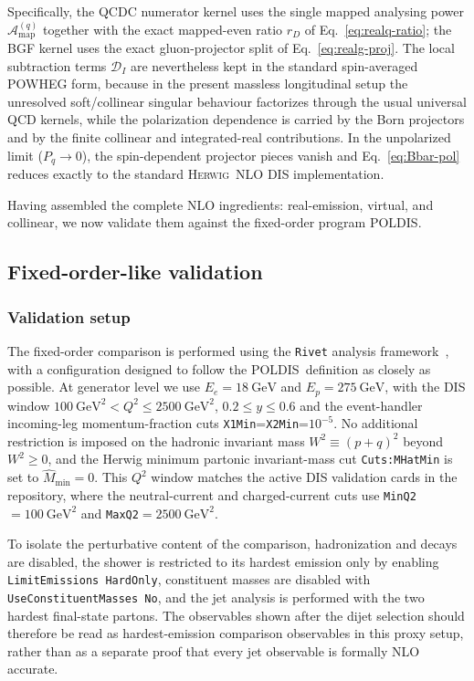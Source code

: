 \documentclass[a4paper,11pt]{article}
\newcommand{\Herwig}{\textsc{Herwig}}
\newcommand{\POLDIS}{\textsc{POLDIS}}
\begin{document}
Specifically, the QCDC numerator kernel uses the single mapped analysing power $\mathcal{A}_{\text{map}}^{(q)}$ together with the exact mapped-even ratio $r_D$ of Eq.~\eqref{eq:realq-ratio}; the BGF kernel uses the exact gluon-projector split of Eq.~\eqref{eq:realg-proj}.  The local subtraction terms $\mathcal{D}_I$ are nevertheless kept in the standard spin-averaged POWHEG form, because in the present massless longitudinal setup the unresolved soft/collinear singular behaviour factorizes through the usual universal QCD kernels, while the polarization dependence is carried by the Born projectors and by the finite collinear and integrated-real contributions.
In the unpolarized limit ($P_q\to0$), the spin-dependent projector pieces vanish and Eq.~\eqref{eq:Bbar-pol} reduces exactly to the standard \Herwig\ NLO DIS implementation.

Having assembled the complete NLO ingredients: real-emission, virtual, and collinear, we now validate them against the fixed-order program \POLDIS.

\subsection{Fixed-order-like validation}

\subsubsection{Validation setup}
The fixed-order comparison is performed using the \texttt{Rivet} analysis framework~\cite{Bierlich:2024vqo}, with a configuration designed to
follow the \POLDIS\ definition as closely as possible. At generator
level we use $E_e=18~\mathrm{GeV}$ and $E_p=275~\mathrm{GeV}$, with the DIS window
$100~\mathrm{GeV}^2 < Q^2 \le 2500~\mathrm{GeV}^2$, $0.2 \le y \le 0.6$ and
the event-handler incoming-leg momentum-fraction cuts \texttt{X1Min}=\texttt{X2Min}=$10^{-5}$. No additional restriction is imposed on the hadronic invariant mass $W^2 \equiv (p + q)^2$ beyond
$W^2 \ge 0$, and the Herwig minimum partonic invariant-mass cut \texttt{Cuts:MHatMin} is set to
$\hat{M}_{\mathrm{min}}=0$.
This $Q^2$ window matches the active DIS validation cards in the repository, where the neutral-current and charged-current cuts use \texttt{MinQ2}$=100~\mathrm{GeV}^2$ and \texttt{MaxQ2}$=2500~\mathrm{GeV}^2$.

To isolate the perturbative content of the comparison, hadronization and decays are disabled, the shower
is restricted to its hardest emission only by enabling \texttt{LimitEmissions HardOnly}, constituent masses are disabled with \texttt{UseConstituentMasses No}, and the
jet analysis is performed with the two hardest final-state partons. The observables shown after the dijet selection should therefore be read as hardest-emission comparison observables in this proxy setup, rather than as a separate proof that every jet observable is formally NLO accurate.
\end{document}
